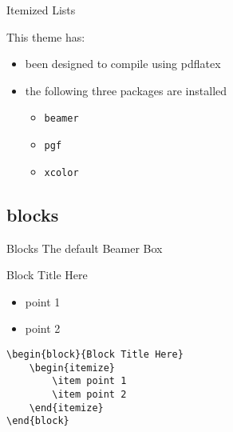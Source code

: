 \documentclass[compress]{beamer}
\begin{document}

\begin{frame}{Itemized Lists}

This theme has:

\begin{itemize}
	\item been designed to compile using pdflatex 
	\item the following three packages are installed
	\begin{itemize}
		\item \texttt{beamer}
		\item \texttt{pgf}
		\item \texttt{xcolor}
	\end{itemize}
	
\end{itemize}

\end{frame}

\subsection{blocks}


\begin{frame}[containsverbatim]{Blocks}
The default Beamer Box
\begin{block}{Block Title Here}
	\begin{itemize}
		\item point 1
		\item point 2
	\end{itemize}
\end{block}
\begin{lstlisting}
\begin{block}{Block Title Here}
	\begin{itemize}
		\item point 1
		\item point 2
	\end{itemize}
\end{block}
\end{lstlisting}
\end{frame}
\end{document}

